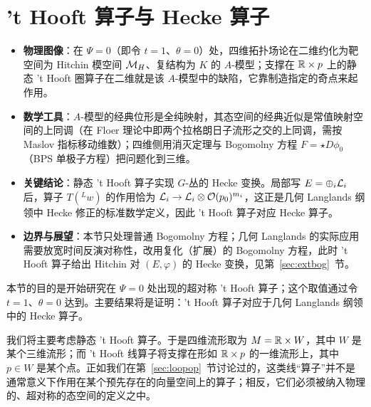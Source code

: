 
\section{'t Hooft 算子与 Hecke 算子}
\label{sec:thooftheckeop}

\begin{keytakeaways}
  \begin{itemize}[leftmargin=1.4em,itemsep=2pt,topsep=2pt]
    \item \textbf{物理图像}：在 $\Psi=0$（即令 $t=1$、$\theta=0$）处，四维拓扑场论在二维约化为靶空间为 Hitchin 模空间 $\MH$、复结构为 $K$ 的 $A$-模型；支撑在 $\Bbb{R}\times p$ 上的静态 't Hooft 圈算子在二维就是该 $A$-模型中的缺陷，它靠制造指定的奇点来起作用。
    \item \textbf{数学工具}：$A$-模型的经典位形是全纯映射，其态空间的经典近似是常值映射空间的上同调（在 Floer 理论中即两个拉格朗日子流形之交的上同调，需按 Maslov 指标移动维数）；四维侧用消灭定理与 Bogomolny 方程 $F=\star D\phi_0$（BPS 单极子方程）把问题化到三维。
    \item \textbf{关键结论}：静态 't Hooft 算子实现 $G$-丛的 Hecke 变换。局部写 $E=\oplus_i{\cal L}_i$ 后，算子 $T({}^L w)$ 的作用恰为 ${\cal L}_i\to{\cal L}_i\otimes{\cal O}(p_0)^{m_i}$，这正是几何 Langlands 纲领中 Hecke 修正的标准数学定义，因此 't Hooft 算子对应 Hecke 算子。
    \item \textbf{边界与展望}：本节只处理普通 Bogomolny 方程；几何 Langlands 的实际应用需要放宽时间反演对称性，改用复化（扩展）的 Bogomolny 方程，此时 't Hooft 算子给出 Hitchin 对 $(E,\varphi)$ 的 Hecke 变换，见第~\ref{sec:extbog}~节。
  \end{itemize}
\end{keytakeaways}

本节的目的是开始研究在 $\Psi=0$ 处出现的超对称 't Hooft 算子；这个取值通过令 $t=1$、$\theta=0$ 达到。主要结果将是证明：'t Hooft 算子对应于几何 Langlands 纲领中的 Hecke 算子。

我们将主要考虑静态 't Hooft 算子。于是四维流形取为 $M=\Bbb{R}\times W$，其中 $W$ 是某个三维流形；而 't Hooft 线算子将支撑在形如 $\Bbb{R}\times p$ 的一维流形上，其中 $p\in W$ 是某个点。正如我们在第~\ref{sec:loopop}~节讨论过的，这类线“算子”并不是通常意义下作用在某个预先存在的向量空间上的算子；相反，它们必须被纳入物理的、超对称的态空间的定义之中。

